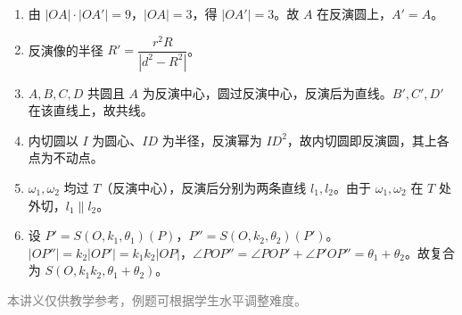 \documentclass[12pt, a4paper]{ctexart}
\begin{document}
\begin{knowledgebox}[参考答案]
\begin{enumerate}
  \item 由 $|OA| \cdot |OA'| = 9$，$|OA| = 3$，得 $|OA'| = 3$。故 $A$ 在反演圆上，$A' = A$。
  \item 反演像的半径 $R' = \dfrac{r^2 R}{|d^2 - R^2|}$。
  \item $A, B, C, D$ 共圆且 $A$ 为反演中心，圆过反演中心，反演后为直线。$B', C', D'$ 在该直线上，故共线。
  \item 内切圆以 $I$ 为圆心、$ID$ 为半径，反演幂为 $ID^2$，故内切圆即反演圆，其上各点为不动点。
  \item $\omega_1, \omega_2$ 均过 $T$（反演中心），反演后分别为两条直线 $l_1, l_2$。由于 $\omega_1, \omega_2$ 在 $T$ 处外切，$l_1 \parallel l_2$。
  \item 设 $P' = S(O, k_1, \theta_1)(P)$，$P'' = S(O, k_2, \theta_2)(P')$。$|OP''| = k_2 |OP'| = k_1 k_2 |OP|$，$\angle POP'' = \angle POP' + \angle P'OP'' = \theta_1 + \theta_2$。故复合为 $S(O, k_1 k_2, \theta_1 + \theta_2)$。
\end{enumerate}
\end{knowledgebox}

\vfill
\begin{center}
\small\textcolor{gray}{本讲义仅供教学参考，例题可根据学生水平调整难度。}
\end{center}
\end{document}
